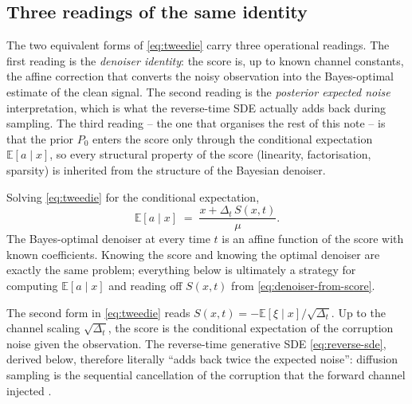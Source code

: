 \documentclass[11pt]{article}
\theoremstyle{definition}
\newcommand{\E}{\mathbb{E}}
\newcommand{\Detl}{\Delta_t}
\newcommand{\score}{S(x, t)}
\begin{document}
\subsection{Three readings of the same identity}\label{sec:tweedie-readings}

The two equivalent forms of \eqref{eq:tweedie} carry three
operational readings. The first reading is the \emph{denoiser
identity}: the score is, up to known channel constants, the affine
correction that converts the noisy observation into the Bayes-optimal
estimate of the clean signal. The second reading is the
\emph{posterior expected noise} interpretation, which is what the
reverse-time SDE actually adds back during sampling. The third
reading -- the one that organises the rest of this note -- is that the
prior \(P_0\) enters the score only through the conditional
expectation \(\E[a \mid x]\), so every structural property of the
score (linearity, factorisation, sparsity) is inherited from the
structure of the Bayesian denoiser.

\begin{bayesianview}
Solving \eqref{eq:tweedie} for the conditional expectation,
\begin{equation}\label{eq:denoiser-from-score}
    \E[a \mid x] \;=\; \frac{x + \Detl\, S(x, t)}{\mu}.
\end{equation}
The Bayes-optimal denoiser at every time \(t\) is an affine function
of the score with known coefficients. Knowing the score and knowing
the optimal denoiser are exactly the same problem; everything below is
ultimately a strategy for computing
\(\E[a \mid x]\) and reading off \(\score\) from
\eqref{eq:denoiser-from-score}.
\end{bayesianview}

\begin{bayesianview}
The second form in \eqref{eq:tweedie} reads
\(\score = -\E[\xi \mid x] / \sqrt{\Detl}\). Up to the channel
scaling \(\sqrt{\Detl}\), the score is the conditional expectation
of the corruption noise given the observation. The reverse-time
generative SDE
\eqref{eq:reverse-sde}, derived below, therefore literally ``adds
back twice the expected noise'': diffusion sampling is the sequential
cancellation of the corruption that the forward channel injected
\citep{Anderson1982, Song2021SDE, Ho2020}.
\end{bayesianview}
\end{document}
